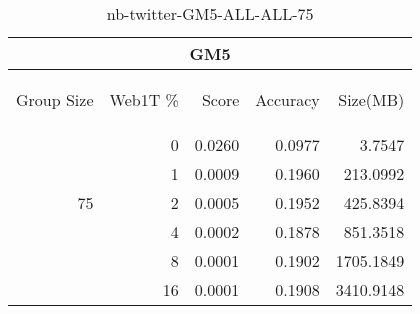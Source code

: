 \begin{center}
\begin{table}[htbp]
\begin{tabular}{ | r | r | r | r | r |}
\hline
\multicolumn{5}{|c|}{GM5}\\
\hline
\begin{sideways}Group Size\end{sideways} & \begin{sideways}Web1T \%\end{sideways} & \begin{sideways}Score\end{sideways} & \begin{sideways}Accuracy\end{sideways} & \begin{sideways}Size(MB)\end{sideways}\\
\hline
\multirow{5}{*}{75}
 & 0 & 0.0260 & 0.0977 & 3.7547\\ \cline{2-5}
 & 1 & 0.0009 & 0.1960 & 213.0992\\ \cline{2-5}
 & 2 & 0.0005 & 0.1952 & 425.8394\\ \cline{2-5}
 & 4 & 0.0002 & 0.1878 & 851.3518\\ \cline{2-5}
 & 8 & 0.0001 & 0.1902 & 1705.1849\\ \cline{2-5}
 & 16 & 0.0001 & 0.1908 & 3410.9148\\ \cline{2-5}
\hline
\end{tabular}
\caption{nb-twitter-GM5-ALL-ALL-75}
\label{table:nb-twitter-GM5-ALL-ALL-75}
\end{table}
\end{center}


